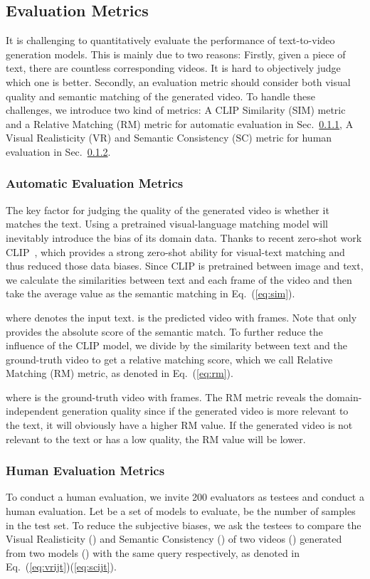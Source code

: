 \documentclass{article}
\begin{document}
\subsection{Evaluation Metrics}
It is challenging to quantitatively evaluate the performance of text-to-video generation models. This is mainly due to two reasons: Firstly, given a piece of text, there are countless corresponding videos. It is hard to objectively judge which one is better. Secondly, an evaluation metric should consider both visual quality and semantic matching of the generated video. To handle these challenges, we introduce two kind of metrics: A CLIP Similarity (SIM) metric and a Relative Matching (RM) metric for automatic evaluation in Sec.~\ref{sec:rmm},  A Visual Realisticity (VR) and Semantic Consistency (SC) metric for human evaluation in Sec.~\ref{sec:msm}.

\subsubsection{Automatic Evaluation Metrics} \label{sec:rmm}
The key factor for judging the quality of the generated video is whether it matches the text. Using a pretrained visual-language matching model will inevitably introduce the bias of its domain data. Thanks to recent zero-shot work CLIP~\cite{radfordLearningTransferableVisual2021}, which provides a strong zero-shot ability for visual-text matching and thus reduced those data biases. Since CLIP is pretrained between image and text, we calculate the similarities between text and each frame of the video and then take the average value as the semantic matching in Eq.~(\ref{eq:sim}).

   where  denotes the input text.  is the predicted video with  frames.  Note that  only provides the absolute score of the semantic match. To further reduce the influence of the CLIP model, we divide  by the similarity between text and the ground-truth video to get a relative matching score, which we call Relative Matching (RM) metric, as denoted in Eq.~(\ref{eq:rm}).

where  is the ground-truth video with  frames. The RM metric reveals the domain-independent generation quality since if the generated video is more relevant to the text, it will obviously have a higher RM value. If the generated video is not relevant to the text or has a low quality, the RM value will be lower.

\subsubsection{Human Evaluation Metrics} \label{sec:msm}
To conduct a human evaluation, we invite 200 evaluators as testees and conduct a human evaluation.  Let  be a set of models to evaluate,  be the number of samples in the test set. To reduce the subjective biases, we ask the testees to compare the Visual Realisticity () and Semantic Consistency () of two videos () generated from two models () with the same query  respectively, as denoted in Eq.~(\ref{eq:vrijt})(\ref{eq:scijt}).
\end{document}
